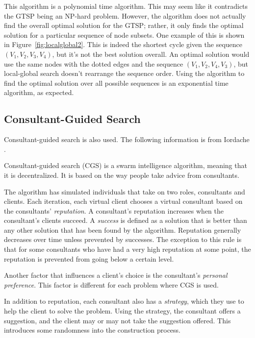 \documentclass{sig-alternate}
\begin{document}
This algorithm is a polynomial time algorithm. This may seem like it contradicts the GTSP being an NP-hard problem. However, the algorithm does not actually find the overall optimal solution for the GTSP; rather, it only finds the optimal solution for a particular sequence of node subsets. One example of this is shown in Figure~\ref{fig:localglobal2}. This is indeed the shortest cycle given the sequence $(V_{1},V_{2},V_{3},V_{4})$, but it's not the best solution overall. An optimal solution would use the same nodes with the dotted edges and the sequence $(V_{1},V_{2},V_{4},V_{3})$, but local-global search doesn't rearrange the sequence order. Using the algorithm to find the optimal solution over all possible sequences is an exponential time algorithm, as expected. 

\subsection{Consultant-Guided Search}
\label{subs:CGS}
Consultant-guided search is also used. The following information is from Iordache  \cite{Iordache:2010}. 

Consultant-guided search (CGS) is a swarm intelligence algorithm, meaning that it is decentralized. It is based on the way people take advice from consultants. 

The algorithm has simulated individuals that take on two roles, consultants and clients. Each iteration, each virtual client chooses a virtual consultant based on the consultants' \textit{reputation}. A consultant's reputation increases when the consultant's clients succeed. A \textit{success} is defined as a solution that is better than any other solution that has been found by the algorithm. Reputation generally decreases over time unless prevented by successes. The exception to this rule is that for some consultants who have had a very high reputation at some point, the reputation is prevented from going below a certain level. 

Another factor that influences a client's choice is the consultant's \textit{personal preference}. This factor is different for each problem where CGS is used. 

In addition to reputation, each consultant also has a \textit{strategy}, which they use to help the client to solve the problem. Using the strategy, the consultant offers a suggestion, and the client may or may not take the suggestion offered. This introduces some randomness into the construction process. 
\end{document}
